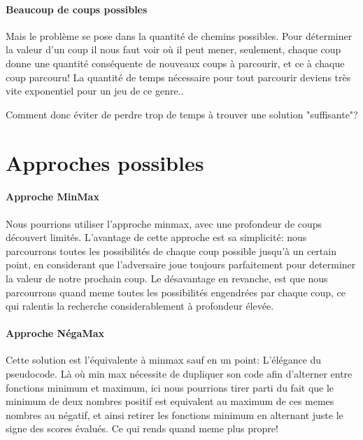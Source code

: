 \documentclass{scrreprt}
\begin{document}
    \paragraph{Beaucoup de coups possibles}
    Mais le problème se pose dans la quantité de chemins possibles.
    Pour déterminer la valeur d'un coup il nous faut voir où il peut mener,
    seulement, chaque coup donne une quantité conséquente de nouveaux coups à
    parcourir, et ce à chaque coup parcouru!
    La quantité de temps nécessaire pour tout parcourir deviens très vite
    exponentiel pour un jeu de ce genre..

    \begin{problem}
        Comment donc éviter de perdre trop de temps à trouver une solution
        "suffisante"?
    \end{problem}

    \section{Approches possibles}

    \paragraph{Approche MinMax}
    Nous pourrions utiliser l'approche minmax, avec une profondeur de coups
    découvert limités.
    L'avantage de cette approche est sa simplicité: nous parcourrons toutes
    les possibilités de chaque coup possible jusqu'à un certain point, en
    considerant que l'adversaire joue toujours parfaitement pour determiner
    la valeur de notre prochain coup.
    Le désavantage en revanche, est que nous parcourrons quand meme toutes
    les possibilités engendrées par chaque coup, ce qui ralentis la recherche
    considerablement à profondeur élevée.

    \paragraph{Approche NégaMax}
    Cette solution est l'équivalente à minmax sauf en un point: L'élégance du
    pseudocode.
    Là où min max nécessite de dupliquer son code afin d'alterner entre
    fonctions minimum et maximum, ici nous pourrions tirer parti du fait que
    le minimum de deux nombres positif est equivalent au maximum de ces memes
    nombres au négatif, et ainsi retirer les fonctions minimum en alternant
    juste le signe des scores évalués.
    Ce qui rends quand meme plus propre!
\end{document}
